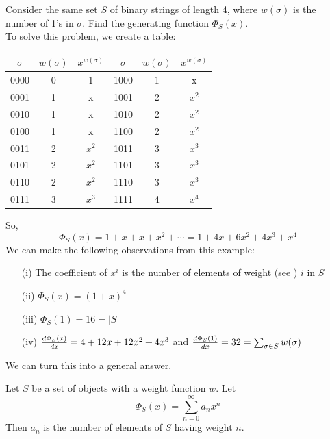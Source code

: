 \documentclass[english, 11pt]{article}
\begin{document}
   \begin{exmp}
     Consider the same set $S$ of binary strings of length 4, where $w(\sigma)$ is the number of 1's in $\sigma$. Find the generating function $\Phi_S(x)$. \\
     To solve this problem, we create a table:
     \begin{tabular}{c | c | c || c | c | c }
       $\sigma$ & $w(\sigma)$ & $x^{w(\sigma)}$ & $\sigma$ & $w(\sigma)$ & $x^{w(\sigma)}$ \\
       \hline
       0000 & 0 & 1 & 1000 & 1 & x \\
       0001 & 1 & x & 1001 & 2 & $x^2$ \\
       0010 & 1 & x & 1010 & 2 & $x^2$ \\
       0100 & 1 & x & 1100 & 2 & $x^2$ \\
       0011 & 2 & $x^2$ & 1011 & 3 & $x^3$ \\
       0101 & 2 & $x^2$ & 1101 & 3 & $x^3$ \\
       0110 & 2 & $x^2$ & 1110 & 3 & $x^3$ \\
       0111 & 3 & $x^3$ & 1111 & 4 & $x^4$ \\
     \end{tabular}

     So,
     \[ \Phi_S(x) = 1 + x + x + x^2 + \cdots = 1 + 4x + 6x^2 + 4x^3 + x^4 \]
     We can make the following observations from this example:
     \begin{itemize}
       \item[(i)] The coefficient of $x^i$ is the number of elements of weight (see ) $i$ in $S$
       \item[(ii)] $\Phi_S(x) = (1+x)^4$
       \item[(iii)] $\Phi_S(1) = 16 = |S|$
       \item[(iv)] $\frac{d\Phi_S(x)}{dx} = 4 + 12x + 12x^2 + 4x^3$ and $\frac{d\Phi_S(1)}{dx} = 32 = \sum_{\sigma \in S} w(\sigma)$
     \end{itemize}
   \end{exmp}

   We can turn this into a general answer.

   \begin{thrm}
     Let $S$ be a set of objects with a weight function $w$. Let
     \[ \Phi_S(x) = \sum_{n=0}^{\infty}a_nx^n \]
     Then $a_n$ is the number of elements of $S$ having weight $n$.
   \end{thrm}
\end{document}
